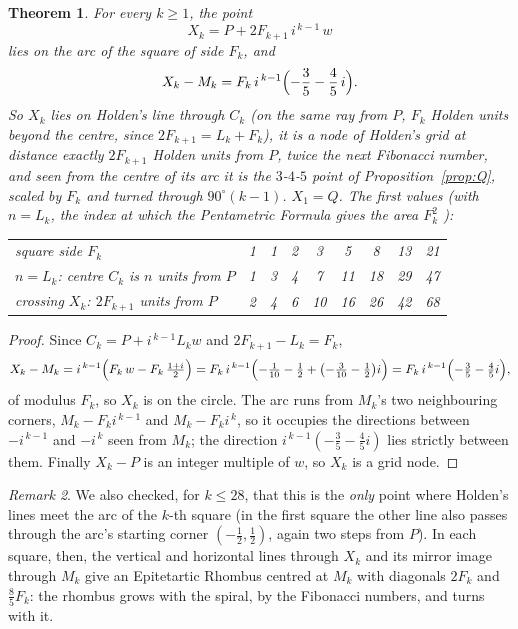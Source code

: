 \documentclass[11pt,a4paper]{article}
\theoremstyle{plain}
\newtheorem{theorem}{Theorem}
\theoremstyle{definition}
\theoremstyle{remark}
\newtheorem{remark}[theorem]{Remark}
\begin{document}
\begin{theorem}\label{thm:every}
For every $k\ge 1$, the point
\[
  X_k = P + 2F_{k+1}\, i^{\,k-1}\, w
\]
lies on the arc of the square of side $F_k$, and
\[
  X_k - M_k = F_k\, i^{\,k-1}\Bigl(-\frac35-\frac45\,i\Bigr).
\]
So $X_k$ lies on Holden's line through $C_k$ (on the same ray from $P$, $F_k$ Holden units beyond the centre, since $2F_{k+1}=L_k+F_k$), it is a node of Holden's grid at distance exactly $2F_{k+1}$ Holden units from $P$, \emph{twice the next Fibonacci number}, and seen from the centre of its arc it is the $3$-$4$-$5$ point of Proposition~\ref{prop:Q}, scaled by $F_k$ and turned through $90^\circ(k-1)$. $X_1=Q$. The first values (with $n=L_k$, the index at which the Pentametric Formula gives the area $F_k^2$ \cite{gt}):
\begin{center}\small
\begin{tabular}{lcccccccc}
square side $F_k$ & 1 & 1 & 2 & 3 & 5 & 8 & 13 & 21\\
$n = L_k$: centre $C_k$ is $n$ units from $P$ & 1 & 3 & 4 & 7 & 11 & 18 & 29 & 47\\
crossing $X_k$: $2F_{k+1}$ units from $P$ & 2 & 4 & 6 & 10 & 16 & 26 & 42 & 68\\
\end{tabular}
\end{center}
\end{theorem}

\begin{proof}
Since $C_k = P + i^{\,k-1}L_k w$ and $2F_{k+1}-L_k = F_k$,
\[
  X_k - M_k = i^{\,k-1}\Bigl(F_k\,w - F_k\,\tfrac{1+i}{2}\Bigr) = F_k\, i^{\,k-1}\Bigl(-\tfrac{1}{10}-\tfrac12 + \bigl(-\tfrac{3}{10}-\tfrac12\bigr) i\Bigr) = F_k\, i^{\,k-1}\Bigl(-\tfrac35-\tfrac45 i\Bigr),
\]
of modulus $F_k$, so $X_k$ is on the circle. The arc runs from $M_k$'s two neighbouring corners, $M_k - F_k i^{\,k-1}$ and $M_k - F_k i^{\,k}$, so it occupies the directions between $-i^{\,k-1}$ and $-i^{\,k}$ seen from $M_k$; the direction $i^{\,k-1}(-\tfrac35-\tfrac45 i)$ lies strictly between them. Finally $X_k - P$ is an integer multiple of $w$, so $X_k$ is a grid node.
\end{proof}

\begin{remark}
We also checked, for $k\le 28$, that this is the \emph{only} point where Holden's lines meet the arc of the $k$-th square (in the first square the other line also passes through the arc's starting corner $(-\tfrac12,\tfrac12)$, again two steps from $P$). In each square, then, the vertical and horizontal lines through $X_k$ and its mirror image through $M_k$ give an Epitetartic Rhombus centred at $M_k$ with diagonals $2F_k$ and $\tfrac85 F_k$: the rhombus grows with the spiral, by the Fibonacci numbers, and turns with it.
\end{remark}
\end{document}
